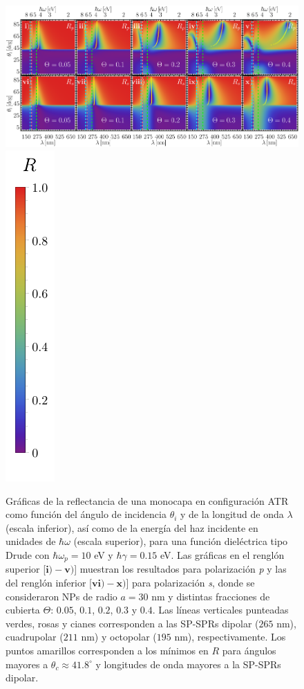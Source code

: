 	\begin{figure}[h!]\centering
\includegraphics[width = .9\linewidth]{2-Resultados/figs/2-Wp10ThetaVar/0-2D_Grid.png}%
\includegraphics[scale=.85, trim={00 -5 00 00}, clip]{2-Resultados/figs/0-RBar_v}\vspace*{-.5em}
	\caption{Gráficas de la reflectancia de una monocapa en configuración ATR como función del ángulo de incidencia $\theta_i$ y de la longitud de onda $\lambda$ (escala inferior), así como de la energía del haz incidente en unidades de $\hbar\omega$ (escala superior), para una función dieléctrica tipo Drude con $\hbar\omega_p=10$ eV  y  $\hbar\gamma=0. 15$ eV.  Las gráficas   en el renglón superior [$\mathbf{i)-v)}$] muestran los resultados  para  polarización \emph{p} y las del renglón inferior  [$\mathbf{vi)-x)}$] para polarización  \emph{s}, donde se consideraron NPs de radio $a=30$ nm y distintas fracciones de cubierta $\Theta$: $0. 05$, $0. 1$, $0. 2$, $0. 3$ y $0. 4$. Las líneas verticales punteadas verdes, rosas y cianes corresponden a las SP-SPRs dipolar ($265$ nm), cuadrupolar ($211$ nm) y octopolar ($195$ nm), respectivamente.  Los puntos amarillos corresponden a los mínimos en $R$ para ángulos mayores a $\theta_c\approx 41.8^\circ$ y longitudes de onda mayores a la SP-SPRs dipolar. }	\label{fig:R-ATR10}	
	\end{figure}				
		
